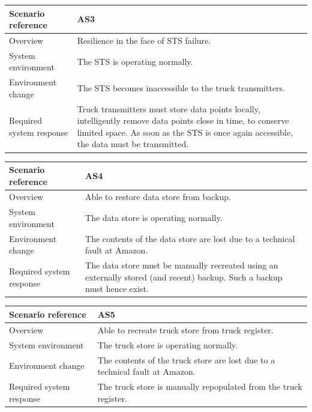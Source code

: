\documentclass[a4paper,11pt]{report}
\begin{document}
\begin{center}
  \begin{tabular}[h!]{| >{\columncolor{gray}}p{} | p{} |}
    \hline
    Scenario reference & AS3 \\
    \hline
    Overview & Resilience in the face of STS failure. \\
    \hline
    System environment & The STS is operating normally. \\
    \hline
    Environment change & The STS becomes inaccessible to the truck transmitters. \\
    \hline
    Required system response & Truck transmitters must store data points locally, intelligently remove data points close in time, to conserve limited space.  As soon as the STS is once again accessible, the data must be transmitted.  \\
    \hline
  \end{tabular}
\end{center}

\begin{center}
  \begin{tabular}[h!]{| >{\columncolor{gray}}p{} | p{} |}
    \hline
    Scenario reference & AS4 \\
    \hline
    Overview & Able to restore data store from backup. \\
    \hline
    System environment & The data store is operating normally. \\
    \hline
    Environment change & The contents of the data store are lost due to a technical fault at Amazon. \\
    \hline
    Required system response & The data store must be manually recreated using an externally stored (and recent) backup.  Such a backup must hence exist. \\
    \hline
  \end{tabular}
\end{center}

\begin{center}
  \begin{tabular}[h!]{| >{\columncolor{gray}}p{} | p{} |}
    \hline
    Scenario reference & AS5 \\
    \hline
    Overview & Able to recreate truck store from truck register. \\
    \hline
    System environment & The truck store is operating normally. \\
    \hline
    Environment change & The contents of the truck store are lost due to a technical fault at Amazon. \\
    \hline
    Required system response & The truck store is manually repopulated from the truck register. \\
    \hline
  \end{tabular}
\end{center}
\end{document}
